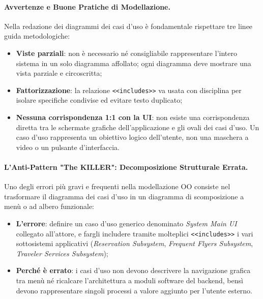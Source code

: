 \documentclass[12pt]{extarticle}
\begin{document}
\paragraph{Avvertenze e Buone Pratiche di Modellazione.}
Nella redazione dei diagrammi dei casi d'uso è fondamentale rispettare tre linee guida metodologiche:
\begin{itemize}
    \item \textbf{Viste parziali}: non è necessario né consigliabile rappresentare l'intero sistema in un solo diagramma affollato; ogni diagramma deve mostrare una vista parziale e circoscritta;
    \item \textbf{Fattorizzazione}: la relazione \texttt{<<includes>>} va usata con disciplina per isolare specifiche condivise ed evitare testo duplicato;
    \item \textbf{Nessuna corrispondenza 1:1 con la UI}: non esiste una corrispondenza diretta tra le schermate grafiche dell'applicazione e gli ovali dei casi d'uso. Un caso d'uso rappresenta un obiettivo logico dell'utente, non una maschera a video o un pulsante d'interfaccia.
\end{itemize}

\paragraph{L'Anti-Pattern "The KILLER": Decomposizione Strutturale Errata.}
Uno degli errori più gravi e frequenti nella modellazione OO consiste nel trasformare il diagramma dei casi d'uso in un diagramma di scomposizione a menù o ad albero funzionale:
\begin{itemize}
    \item \textbf{L'errore}: definire un caso d'uso generico denominato \textit{System Main UI} collegato all'attore, e fargli includere tramite molteplici \texttt{<<includes>>} i vari sottosistemi applicativi (\textit{Reservation Subsystem}, \textit{Frequent Flyers Subsystem}, \textit{Traveler Services Subsystem});
    \item \textbf{Perché è errato}: i casi d'uso non devono descrivere la navigazione grafica tra menù né ricalcare l'architettura a moduli software del backend, bensì devono rappresentare singoli processi a valore aggiunto per l'utente esterno.
\end{itemize}
\end{document}
